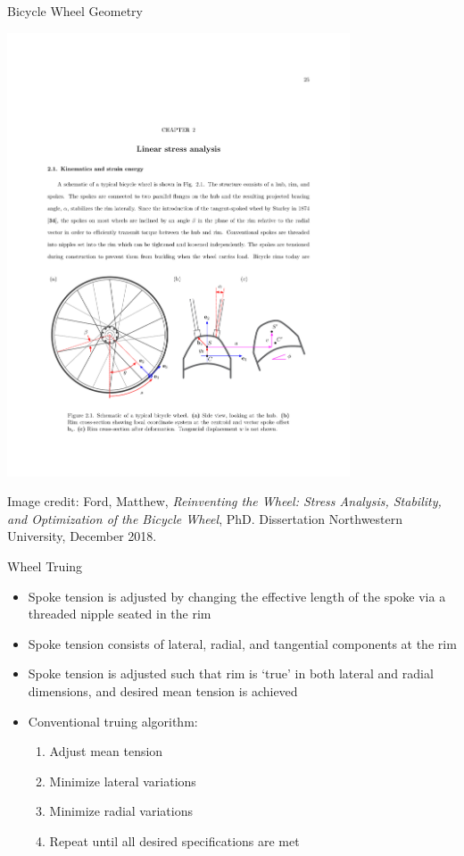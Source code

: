 \documentclass[mathserif]{beamer}
\begin{document}
\begin{frame}{Bicycle Wheel Geometry}
    \begin{center}
    	\includegraphics[width=4.0in]{fig_geometry.pdf}
    \end{center}
    \begin{block}{}
    {\tiny Image credit: Ford, Matthew, \emph{Reinventing the Wheel: Stress Analysis, Stability, and Optimization of the Bicycle Wheel}, PhD. Dissertation Northwestern University, December 2018.}
    \end{block}
\end{frame}

\begin{frame}{Wheel Truing}
	\begin{itemize}
        \item Spoke tension is adjusted by changing the effective length of the spoke via a threaded nipple seated in the rim
        \item Spoke tension consists of lateral, radial, and tangential components at the rim           
        \item Spoke tension is adjusted such that rim is `true' in both lateral and radial dimensions, and desired mean tension is achieved
        \item Conventional truing algorithm:
        \begin{enumerate}
            \item Adjust mean tension
            \item Minimize lateral variations
            \item Minimize radial variations
            \item Repeat until all desired specifications are met
        \end{enumerate}
	\end{itemize}
\end{frame}
\end{document}
